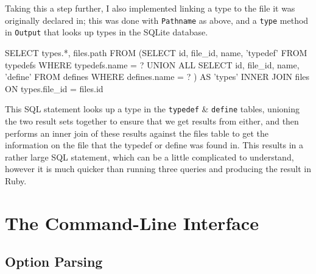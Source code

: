     Taking this a step further, I also implemented linking a type to the file it
    was originally declared in; this was done with \lstinline|Pathname| as
    above, and a \lstinline|type| method in \lstinline|Output| that looks up
    types in the SQLite database.

    \begin{code}[language=sql, gobble=6]
      SELECT types.*, files.path FROM
       (SELECT id, file_id, name, 'typedef' FROM typedefs WHERE typedefs.name = ?
        UNION ALL
        SELECT id, file_id, name, 'define' FROM defines WHERE defines.name = ?
       ) AS 'types' INNER JOIN files ON types.file_id = files.id
    \end{code}

    This SQL statement looks up a type in the \lstinline|typedef| \&
    \lstinline|define| tables, unioning the two result sets together to ensure
    that we get results from either, and then performs an inner join of these
    results against the files table to get the information on the file that the
    typedef or define was found in. This results in a rather large SQL
    statement, which can be a little complicated to understand, however it is
    much quicker than running three queries and producing the result in Ruby.

\section{The Command-Line Interface}

  \subsection{Option Parsing}
